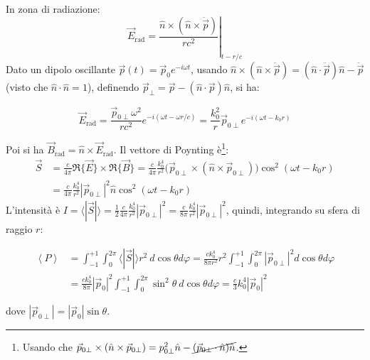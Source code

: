 \documentclass[10pt, a4paper]{scrartcl}
\newcommand*\Eval[3]{\left.#1\right\rvert_{#2}^{#3}}
\numberwithin{equation}{subsection}
\theoremstyle{style1}
\newenvironment{boxenv}[1][]{
    \begin{eqbox}[#1]
    }{
   \end{eqbox}
}
\begin{document}
In zona di radiazione:
\[
	\vec{E}_\text{rad} = \Eval{\frac{\hat{n} \times (\hat{n}\times \ddot{\vec{p}})}{rc^2}}{t- r / c}{}
\] 
Dato un dipolo oscillante $\vec{p} (t) = \vec{p}_0 e^{-i\omega t} $, usando $\hat{n}\times (\hat{n}\times \ddot{\vec{p}}) = (\hat{n}\cdot \ddot{\vec{p}}) \hat{n}- \ddot{\vec{p}}$ (visto che $\hat{n}\cdot \hat{n}= 1$), definendo $\vec{p}_\perp = \vec{p}-(\hat{n}\cdot \vec{p}) \hat{n}$, si ha:
\begin{boxenv}[]
	\begin{equation}\label{Ediposc}
	\vec{E}_\text{rad} = \frac{\vec{p}_{0\perp} \omega^2}{rc^2} e^{-i(\omega t - \omega r / c)} = \frac{k_0^2}{r} \vec{p}_{0\perp} e^{-i(\omega t - k_0r )} 
\end{equation}
\end{boxenv}
\noindent Poi si ha $\vec{B}_\text{rad} = \hat{n}\times \vec{E}_\text{rad}$. Il vettore di Poynting \`e\footnote{Usando che $\vec{p}_{0\perp} \times (\hat{n}\times \vec{p}_{0\perp}) = p_{0\perp} ^2 \hat{n} - \cancel{(\vec{p}_{0\perp} \cdot \hat{n} )\hat{n}}$.}:
\begin{equation}
	\begin{split}
		\vec{S} &= \frac{c}{4\pi} \Re \{ \vec{E} \} \times \Re \{ \vec{B} \} = \frac{c}{4\pi} \frac{k_0^4}{r^2}\big(\vec{p}_{0\perp} \times (\hat{n}\times \vec{p}_{0\perp} )\big) \cos^2 (\omega t - k_0 r)\\
			& = \frac{c}{4\pi} \frac{k_0^4}{r^2} \left\lvert \vec{p}_{0\perp}  \right\rvert ^2 \hat{n} \cos^2 (\omega t - k_0r)
	\end{split}
\end{equation}
L'intensit\`a \`e $I = \langle|\vec{S}|\rangle =  \frac{1}{2} \frac{c}{4\pi} \frac{k_0^4}{r^2} |\vec{p}_{0\perp} | ^2 = \frac{c}{8\pi} \frac{k_0^4}{r^2} |\vec{p}_{0\perp} |^2$, quindi, integrando su sfera di raggio $r$:
\begin{boxenv}[]
\begin{equation}
	\begin{split}
		\left\langle P \right\rangle &= \int_{-1} ^{+1} \int_{0} ^{2\pi} \langle|\vec{S}|\rangle r^2 \ d\cos\theta  d\varphi = \frac{ck_0^4}{8\pi r^2} r^2 \int_{-1} ^{+1} \int_{0} ^{2\pi} |\vec{p}_{0\perp} |^2 d \cos\theta d\varphi \\
					     &= \frac{ck_0^4}{8\pi} |\vec{p}_0|^2 \int_{-1} ^{+1 }  \int_{0} ^{2\pi} \sin^2 \theta \ d\cos\theta  d \varphi = \frac{c}{3}k_0^4 |\vec{p}_0|^2
	\end{split}
\end{equation}
\end{boxenv}
\noindent dove $|\vec{p}_{0\perp} | = |\vec{p}_0| \sin\theta $.
\end{document}
